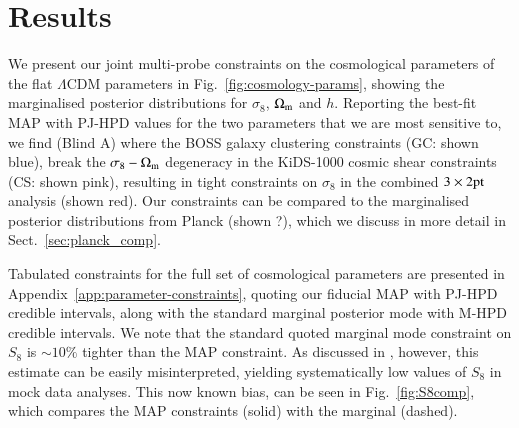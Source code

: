 \section{Results}
\label{sec:results}
We present our joint multi-probe constraints on the cosmological parameters of the flat $\Lambda$CDM parameters in Fig.~\ref{fig:cosmology-params}, showing the marginalised posterior distributions for $\sigma_8$, $\Omega_{\rm m}$ and $h$.   Reporting the best-fit MAP with PJ-HPD values for the two parameters that we are most sensitive to, we find (Blind A)
where the BOSS galaxy clustering constraints (GC: shown blue), break the $\sigma_8-\Omega_{\rm m}$ degeneracy in the KiDS-1000 cosmic shear constraints (CS: shown pink), resulting in tight constraints on $\sigma_8$ in the combined $3\times2{\rm pt}$ analysis (shown red).   Our constraints can be compared to the marginalised posterior distributions from Planck (shown ?), which we discuss in more detail in Sect.~\ref{sec:planck_comp}.

Tabulated constraints for the full set of cosmological parameters are presented in Appendix~\ref{app:parameter-constraints}, quoting our fiducial MAP with PJ-HPD credible intervals, along with the standard marginal posterior mode with M-HPD credible intervals.   We note that the standard quoted marginal mode constraint on $S_8$ is $\sim 10\%$ tighter than the MAP constraint.  As discussed in \citet{joachimi/etal:inprep}, however, this estimate can be easily misinterpreted, yielding systematically low values of $S_8$ in mock data analyses.   This now known bias, can be seen in Fig.~\ref{fig:S8comp}, which compares the MAP constraints (solid) with the marginal (dashed).  

